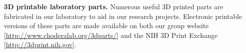 \documentclass[11pt]{article}
\begin{document}

{\bf 3D printable laboratory parts.} Numerous useful 3D printed parts are fabricated in our laboratory to aid in our research projects. Electronic printable versions of these parts are made available on both our group website [\url{http://www.choderalab.org/3dparts/}] and the NIH 3D Print Exchange [\url{http://3dprint.nih.gov}].



\newpage

%
%


\end{document}
